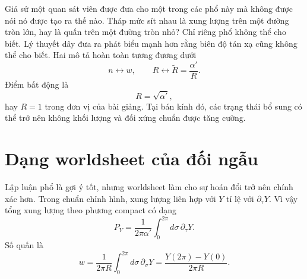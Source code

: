 Giả sử một quan sát viên được đưa cho một trong các phổ này mà không được nói nó được tạo ra thế nào. Tháp mức sít nhau là xung lượng trên một đường tròn lớn, hay là quấn trên một đường tròn nhỏ? Chỉ riêng phổ không thể cho biết. Lý thuyết dây đưa ra phát biểu mạnh hơn rằng biên độ tán xạ cũng không thể cho biết. Hai mô tả hoàn toàn tương đương dưới
\begin{equation}
  n\longleftrightarrow w,
  \qquad
  R\longleftrightarrow \widetilde R=\frac{\alpha'}{R}.
  \label{eq:l10-radius-duality}
\end{equation}
Điểm bất động là
\begin{equation}
  R=\sqrt{\alpha'},
  \label{eq:l10-self-dual-radius}
\end{equation}
hay \(R=1\) trong đơn vị của bài giảng. Tại bán kính đó, các trạng thái bổ sung có thể trở nên không khối lượng và đối xứng chuẩn được tăng cường.

\begin{classroomqa}
\end{classroomqa}

\begin{classroomqa}
\end{classroomqa}

\section{Dạng worldsheet của đối ngẫu}

Lập luận phổ là gợi ý tốt, nhưng worldsheet làm cho sự hoán đổi trở nên chính xác hơn. Trong chuẩn chỉnh hình, xung lượng liên hợp với \(Y\) tỉ lệ với \(\partial_\tau Y\). Vì vậy tổng xung lượng theo phương compact có dạng
\begin{equation}
  P_Y=\frac{1}{2\pi\alpha'}
      \int_0^{2\pi}d\sigma\,\partial_\tau Y.
  \label{eq:l10-worldsheet-momentum}
\end{equation}
Số quấn là
\begin{equation}
  w=\frac{1}{2\pi R}
      \int_0^{2\pi}d\sigma\,\partial_\sigma Y
   =\frac{Y(2\pi)-Y(0)}{2\pi R}.
  \label{eq:l10-worldsheet-winding}
\end{equation}

